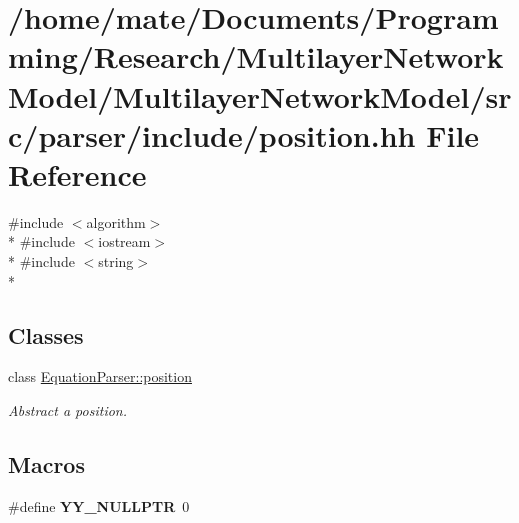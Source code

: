 \hypertarget{position_8hh}{}\section{/home/mate/\+Documents/\+Programming/\+Research/\+Multilayer\+Network\+Model/\+Multilayer\+Network\+Model/src/parser/include/position.hh File Reference}
\label{position_8hh}
{\ttfamily \#include $<$algorithm$>$}\\*
{\ttfamily \#include $<$iostream$>$}\\*
{\ttfamily \#include $<$string$>$}\\*
\subsection*{Classes}
\begin{DoxyCompactItemize}
\item 
class \hyperlink{classEquationParser_1_1position}{Equation\+Parser\+::position}
\begin{DoxyCompactList}\small\item\em Abstract a position. \end{DoxyCompactList}\end{DoxyCompactItemize}
\subsection*{Macros}
\begin{DoxyCompactItemize}
\item 
\#define {\bfseries Y\+Y\+\_\+\+N\+U\+L\+L\+P\+TR}~0\hypertarget{position_8hh_a5a6c82f7ce4ad9cc8c6c08b7a2de5b84}{}\label{position_8hh_a5a6c82f7ce4ad9cc8c6c08b7a2de5b84}

\end{DoxyCompactItemize}
